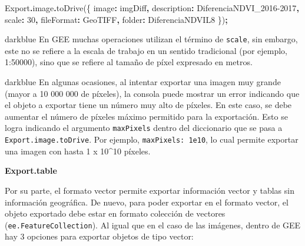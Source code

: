 \documentclass[
  12pt,
  letterpaper,
  twoside]{book}
\newenvironment{Shaded}{\begin{snugshade}}{\end{snugshade}}
\newcommand{\AttributeTok}[1]{\textcolor[rgb]{0.77,0.63,0.00}{#1}}
\newcommand{\DataTypeTok}[1]{\textcolor[rgb]{0.13,0.29,0.53}{#1}}
\newcommand{\DecValTok}[1]{\textcolor[rgb]{0.00,0.00,0.81}{#1}}
\newcommand{\FunctionTok}[1]{\textcolor[rgb]{0.00,0.00,0.00}{#1}}
\newcommand{\NormalTok}[1]{#1}
\newcommand{\OperatorTok}[1]{\textcolor[rgb]{0.81,0.36,0.00}{\textbf{#1}}}
\newcommand{\StringTok}[1]{\textcolor[rgb]{0.31,0.60,0.02}{#1}}
\begin{document}
\begin{Shaded}
\begin{Highlighting}[]
\NormalTok{Export}\OperatorTok{.}\AttributeTok{image}\OperatorTok{.}\FunctionTok{toDrive}\NormalTok{(\{}
  \DataTypeTok{image}\OperatorTok{:}\NormalTok{ imgDiff}\OperatorTok{,}
  \DataTypeTok{description}\OperatorTok{:} \StringTok{\textquotesingle{}DiferenciaNDVI\_2016{-}2017\textquotesingle{}}\OperatorTok{,}
  \DataTypeTok{scale}\OperatorTok{:} \DecValTok{30}\OperatorTok{,}
  \DataTypeTok{fileFormat}\OperatorTok{:} \StringTok{\textquotesingle{}GeoTIFF\textquotesingle{}}\OperatorTok{,}
  \DataTypeTok{folder}\OperatorTok{:} \StringTok{\textquotesingle{}DiferenciaNDVIL8\textquotesingle{}}
\NormalTok{\})}\OperatorTok{;} 
\end{Highlighting}
\end{Shaded}

\begin{bluebox2}

\begin{awesomeblock}{5pt}{\faLightbulb}{darkblue}
En GEE muchas operaciones utilizan el término de \texttt{scale}, sin embargo, este no se refiere a la escala de trabajo en un sentido tradicional (por ejemplo, 1:50000), sino que se refiere al tamaño de píxel expresado en metros.

\end{awesomeblock}

\end{bluebox2}

\begin{bluebox2}

\begin{awesomeblock}{5pt}{\faLightbulb}{darkblue}
En algunas ocasiones, al intentar exportar una imagen muy grande (mayor a 10 000 000 de píxeles), la consola puede mostrar un error indicando que el objeto a exportar tiene un número muy alto de píxeles. En este caso, se debe aumentar el número de píxeles máximo permitido para la exportación. Esto se logra indicando el argumento \texttt{maxPixels} dentro del diccionario que se pasa a \texttt{Export.image.toDrive}. Por ejemplo, \texttt{maxPixels:\ 1e10}, lo cual permite exportar una imagen con hasta 1 x 10\^{}10 píxeles.

\end{awesomeblock}

\end{bluebox2}

\textbf{Export.table}

Por su parte, el formato vector permite exportar información vector y tablas sin información geográfica. De nuevo, para poder exportar en el formato vector, el objeto exportado debe estar en formato colección de vectores (\texttt{ee.FeatureCollection}). Al igual que en el caso de las imágenes, dentro de GEE hay 3 opciones para exportar objetos de tipo vector:
\end{document}
